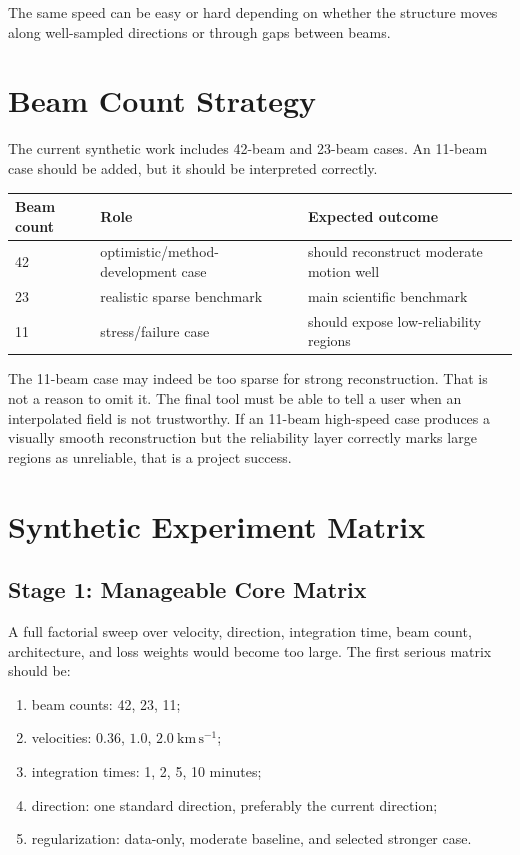 \documentclass[11pt]{article}
\newcommand{\kmps}{\mathrm{km\,s^{-1}}}
\begin{document}
The same speed can be easy or hard depending on whether the structure moves along well-sampled
directions or through gaps between beams.

\section{Beam Count Strategy}

The current synthetic work includes 42-beam and 23-beam cases. An 11-beam case should be added,
but it should be interpreted correctly.

\begin{center}
\begin{tabular}{lll}
\toprule
Beam count & Role & Expected outcome \\
\midrule
42 & optimistic/method-development case & should reconstruct moderate motion well \\
23 & realistic sparse benchmark & main scientific benchmark \\
11 & stress/failure case & should expose low-reliability regions \\
\bottomrule
\end{tabular}
\end{center}

The 11-beam case may indeed be too sparse for strong reconstruction. That is not a reason to omit
it. The final tool must be able to tell a user when an interpolated field is not trustworthy. If an
11-beam high-speed case produces a visually smooth reconstruction but the reliability layer correctly
marks large regions as unreliable, that is a project success.

\section{Synthetic Experiment Matrix}

\subsection{Stage 1: Manageable Core Matrix}

A full factorial sweep over velocity, direction, integration time, beam count, architecture, and loss
weights would become too large. The first serious matrix should be:
\begin{enumerate}[leftmargin=*]
  \item beam counts: 42, 23, 11;
  \item velocities: $0.36$, $1.0$, $2.0~\kmps$;
  \item integration times: 1, 2, 5, 10 minutes;
  \item direction: one standard direction, preferably the current direction;
  \item regularization: data-only, moderate baseline, and selected stronger case.
\end{enumerate}
\end{document}
